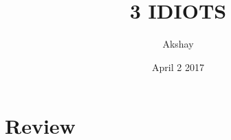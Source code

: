 \documentclass{article}
\title{3 IDIOTS}
\author{Akshay}
\date{April 2 2017}
\begin{document}
\maketitle
\section{Review}
\end{document}
